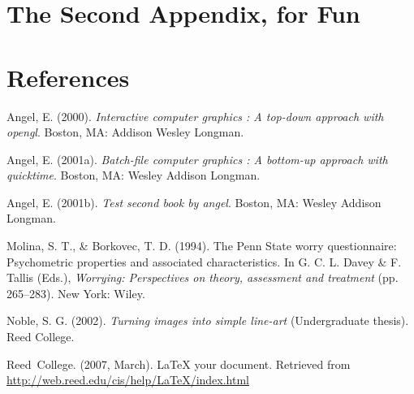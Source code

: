 \documentclass[12pt,twoside]{reedthesis}
\theoremstyle{definition}
\theoremstyle{definition}
\theoremstyle{definition}
\theoremstyle{remark}
\begin{document}
\chapter{The Second Appendix, for
Fun}\label{the-second-appendix-for-fun}

\backmatter

\chapter*{References}\label{references}


\noindent

\setlength{\parindent}{-0.20in} \setlength{\leftskip}{0.20in}
\setlength{\parskip}{8pt}

\hypertarget{refs}{}
\hypertarget{ref-angel2000}{}
Angel, E. (2000). \emph{Interactive computer graphics : A top-down
approach with opengl}. Boston, MA: Addison Wesley Longman.

\hypertarget{ref-angel2001}{}
Angel, E. (2001a). \emph{Batch-file computer graphics : A bottom-up
approach with quicktime}. Boston, MA: Wesley Addison Longman.

\hypertarget{ref-angel2002a}{}
Angel, E. (2001b). \emph{Test second book by angel}. Boston, MA: Wesley
Addison Longman.

\hypertarget{ref-Molina1994}{}
Molina, S. T., \& Borkovec, T. D. (1994). The Penn State worry
questionnaire: Psychometric properties and associated characteristics.
In G. C. L. Davey \& F. Tallis (Eds.), \emph{Worrying: Perspectives on
theory, assessment and treatment} (pp. 265--283). New York: Wiley.

\hypertarget{ref-noble2002}{}
Noble, S. G. (2002). \emph{Turning images into simple line-art}
(Undergraduate thesis). Reed College.

\hypertarget{ref-reedweb2007}{}
Reed~College. (2007, March). LaTeX your document. Retrieved from
\url{http://web.reed.edu/cis/help/LaTeX/index.html}


\end{document}
